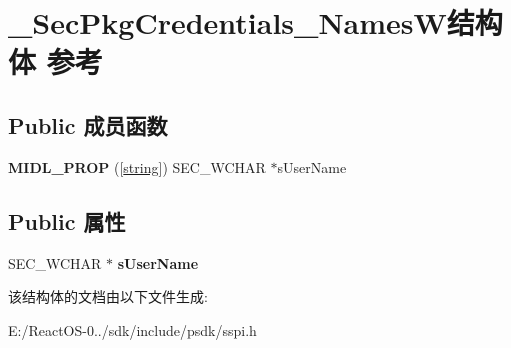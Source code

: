 \hypertarget{struct___sec_pkg_credentials___names_w}{}\section{\+\_\+\+Sec\+Pkg\+Credentials\+\_\+\+Names\+W结构体 参考}
\label{struct___sec_pkg_credentials___names_w}
\subsection*{Public 成员函数}
\begin{DoxyCompactItemize}
\item 
\mbox{\label{struct___sec_pkg_credentials___names_w_a99db48d8c7986a7fc0d6f13f8931dcf3}} 
{\bfseries M\+I\+D\+L\+\_\+\+P\+R\+OP} (\mbox{[}\hyperlink{structstring}{string}\mbox{]}) S\+E\+C\+\_\+\+W\+C\+H\+AR $\ast$s\+User\+Name
\end{DoxyCompactItemize}
\subsection*{Public 属性}
\begin{DoxyCompactItemize}
\item 
\mbox{\label{struct___sec_pkg_credentials___names_w_a420473620023078bf76df8db33cc2ae8}} 
S\+E\+C\+\_\+\+W\+C\+H\+AR $\ast$ {\bfseries s\+User\+Name}
\end{DoxyCompactItemize}


该结构体的文档由以下文件生成\+:\begin{DoxyCompactItemize}
\item 
E\+:/\+React\+O\+S-\/0../sdk/include/psdk/sspi.\+h\end{DoxyCompactItemize}
